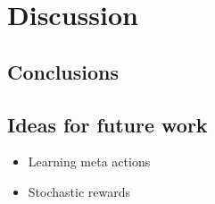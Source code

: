 \chapter{Discussion}
\label{chapter4}

\section{Conclusions}

\section{Ideas for future work}
\begin{itemize}
    \item Learning meta actions
    \item Stochastic rewards
\end{itemize}
